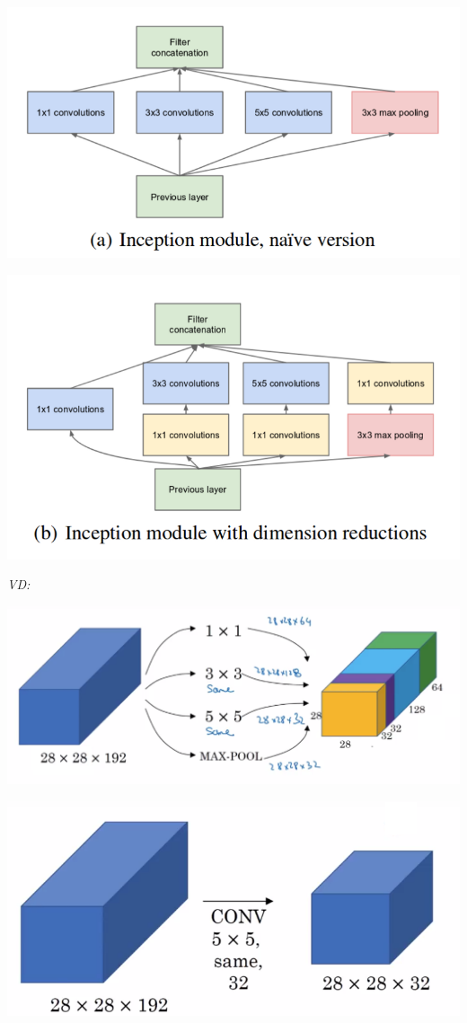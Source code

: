 \documentclass[12pt]{extreport}
\begin{document}
\begin{center}
\includegraphics[scale=0.5]{Image/Inception_basic_1}

\bigskip

\includegraphics[scale=0.5]{Image/Inception_basic_2}
\end{center}

\newpage
\textit{VD:}
\begin{center}
\includegraphics[scale=0.65]{Image/Inception_basic_example}

\includegraphics[scale=0.65]{Image/Inception_basic_example_1}
\end{center}
\end{document}
